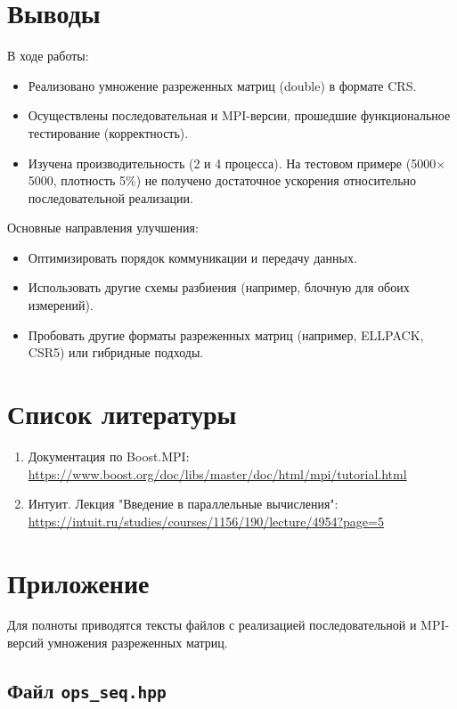 \documentclass[12pt]{article}
\begin{document}
\section{Выводы}
В ходе работы:
\begin{itemize}
    \item Реализовано умножение разреженных матриц (double) в формате CRS.
    \item Осуществлены последовательная и MPI-версии, прошедшие функциональное тестирование (корректность).
    \item Изучена производительность (2 и 4 процесса). На тестовом примере (5000$\times$5000, плотность 5\%) не получено достаточное ускорения относительно последовательной реализации.
\end{itemize}

Основные направления улучшения:
\begin{itemize}
    \item Оптимизировать порядок коммуникации и передачу данных.
    \item Использовать другие схемы разбиения (например, блочную для обоих измерений).
    \item Пробовать другие форматы разреженных матриц (например, ELLPACK, CSR5) или гибридные подходы.
\end{itemize}

\section{Список литературы}
\begin{enumerate}
    \item Документация по Boost.MPI: \url{https://www.boost.org/doc/libs/master/doc/html/mpi/tutorial.html}
    \item Интуит. Лекция "Введение в параллельные вычисления": \url{https://intuit.ru/studies/courses/1156/190/lecture/4954?page=5}
\end{enumerate}

\appendix
\section*{Приложение}

Для полноты приводятся тексты файлов с реализацией последовательной и MPI-версий умножения разреженных матриц.

\subsection*{Файл \texttt{ops\_seq.hpp}}
\end{document}
